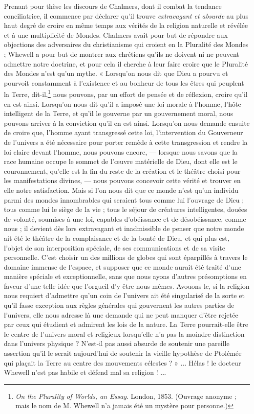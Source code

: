 \documentclass[a4paper, 11pt, oneside]{article}
\begin{document}
Prenant pour thèse les discours de Chalmers, dont il combat la tendance conciliatrice, il commence par déclarer qu'il trouve \emph{extravagant et absurde} au plus haut degré de croire en même temps aux vérités de la religion naturelle et révélée et à une multiplicité de Mondes. Chalmers avait pour but de répondre aux objections des adversaires du christianisme qui croient en la Pluralité des Mondes ; Whewell a pour but de montrer aux chrétiens qu'ils ne doivent ni ne peuvent admettre notre doctrine, et pour cela il cherche à leur faire croire que le Pluralité des Mondes n'est qu'un mythe. « Lorsqu'on nous dit que Dieu a pourvu et pourvoit constamment à l'existence et au bonheur de tous les êtres qui peuplent la Terre, dit-il,\footnote{\emph{On the Plurality of Worlds, an Essay}. London, 1853. (Ouvrage anonyme ; mais le nom de M. Whewell n'a jamais été un mystère pour personne.)} nous pouvons, par un effort de pensée et de réflexion, croire qu'il en est ainsi. Lorsqu'on nous dit qu'il a imposé une loi morale à l'homme, l'hôte intelligent de la Terre, et qu'il le gouverne par un gouvernement moral, nous pouvons arriver à la conviction qu'il en est ainsi. Lorsqu'on nous demande ensuite de croire que, l'homme ayant transgressé cette loi, l'intervention du Gouverneur de l'univers a été nécessaire pour porter remède à cette transgression et rendre la loi claire devant l'homme, nous pouvons encore, --- lorsque nous savons que la race humaine occupe le sommet de l'œuvre matérielle de Dieu, dont elle est le couronnement, qu'elle est la fin du reste de la création et le théâtre choisi pour les manifestations divines, --- nous pouvons concevoir cette vérité et trouver en elle notre satisfaction. Mais si l'on nous dit que ce monde n'est qu'un individu parmi des mondes innombrables qui seraient tous comme lui l'ouvrage de Dieu ; tous comme lui le siège de la vie ; tous le séjour de créatures intelligentes, douées de volonté, soumises à une loi, capables d'obéissance et de désobéissance, comme nous ; il devient dès lors extravagant et inadmissible de penser que notre monde ait été le théâtre de la complaisance et de la bonté de Dieu, et qui plus est, l'objet de son interposition spéciale, de ses communications et de sa visite personnelle. C'est choisir un des millions de globes qui sont éparpillés à travers le domaine immense de l'espace, et supposer que ce monde aurait été traité d'une manière spéciale et exceptionnelle, sans que nous ayons d'autres présomptions en faveur d'une telle idée que l'orgueil d'y être nous-mêmes. Avouons-le, si la religion nous requiert d'admettre qu'un coin de l'univers ait été singularisé de la sorte et qu'il fasse exception aux règles générales qui gouvernent les autres parties de l'univers, elle nous adresse là une demande qui ne peut manquer d'être rejetée par ceux qui étudient et admirent les lois de la nature. La Terre pourrait-elle être le centre de l'univers moral et religieux lorsqu'elle n'a pas la moindre distinction dans l'univers physique ? N'est-il pas aussi absurde de soutenir une pareille assertion qu'il le serait aujourd'hui de soutenir la vieille hypothèse de Ptolémée qui plaçait la Terre au centre des mouvements célestes ? » ... Hélas ! le docteur Whewell n'est pas habile et défend mal sa religion ! ...
\end{document}
